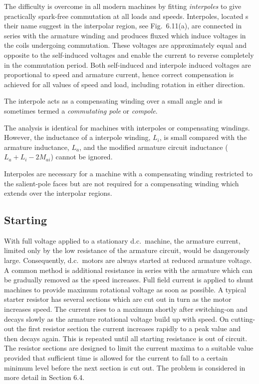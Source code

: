 \documentclass[a4paper,numbers=noenddot,12pt]{scrbook}
\begin{document}
        The difficulty is overcome in all modern machines by fitting \textit{interpoles} to give practically spark-free commutation at all loads and speeds. Interpoles, located s their name suggest in the interpolar region, see Fig.\ 6.11(a), are connected in series with the armature winding and produces fluxed which induce voltages in the coils undergoing commutation. These voltages are approximately equal and opposite to the self-induced voltages and enable the current to reverse
        completely in the commutation period. Both self-induced and interpole induced voltages are proportional to speed and armature current, hence correct compensation is achieved for all values of speed and load, including rotation in either direction.

        The interpole acts as a compensating winding over a small angle and is sometimes termed a \textit{commutating pole} or \textit{compole}.

        The analysis is identical for machines with interpoles or compensating windings. However, the inductance of a interpole winding, $L_i$, is small compared with the armature inductance, $L_a$, and the modified armature circuit inductance ($L_a + L_i - 2M_{ai}$) cannot be ignored.

        Interpoles are necessary for a machine with a compensating winding restricted to the salient-pole faces but are not required for a compensating winding which extends over the interpolar regions.

        \subsection{Starting}
        With full voltage applied to a stationary d.c.\ machine, the armature current, limited only by the low resistance of the armature circuit, would be dangerously large. Consequently, d.c.\ motors are always started at reduced armature voltage. A common method is additional resistance  in series with the armature which can be gradually removed as the speed increases. Full field current is applied to shunt machines to provide maximum rotational voltage as soon as possible. A typical
        starter resistor has several sections which are cut out in turn as the motor increases speed. The current rises to a maximum shortly after switching-on and decays slowly as the armature rotational voltage build up with speed. On cutting-out the first resistor section the current increases rapidly to a peak value and then decays again. This is repeated until all starting resistance is out of circuit. The resistor sections are designed to limit the current maxima to a suitable
        value provided that sufficient time is allowed for the current to fall to a certain minimum level before the next section is cut out. The problem is considered in more detail in Section 6.4.
\end{document}
